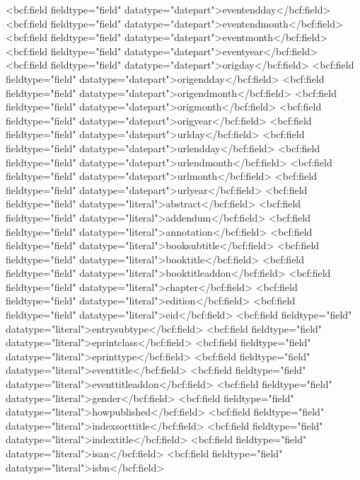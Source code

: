       <bcf:field fieldtype="field" datatype="datepart">eventendday</bcf:field>
      <bcf:field fieldtype="field" datatype="datepart">eventendmonth</bcf:field>
      <bcf:field fieldtype="field" datatype="datepart">eventmonth</bcf:field>
      <bcf:field fieldtype="field" datatype="datepart">eventyear</bcf:field>
      <bcf:field fieldtype="field" datatype="datepart">origday</bcf:field>
      <bcf:field fieldtype="field" datatype="datepart">origendday</bcf:field>
      <bcf:field fieldtype="field" datatype="datepart">origendmonth</bcf:field>
      <bcf:field fieldtype="field" datatype="datepart">origmonth</bcf:field>
      <bcf:field fieldtype="field" datatype="datepart">origyear</bcf:field>
      <bcf:field fieldtype="field" datatype="datepart">urlday</bcf:field>
      <bcf:field fieldtype="field" datatype="datepart">urlendday</bcf:field>
      <bcf:field fieldtype="field" datatype="datepart">urlendmonth</bcf:field>
      <bcf:field fieldtype="field" datatype="datepart">urlmonth</bcf:field>
      <bcf:field fieldtype="field" datatype="datepart">urlyear</bcf:field>
      <bcf:field fieldtype="field" datatype="literal">abstract</bcf:field>
      <bcf:field fieldtype="field" datatype="literal">addendum</bcf:field>
      <bcf:field fieldtype="field" datatype="literal">annotation</bcf:field>
      <bcf:field fieldtype="field" datatype="literal">booksubtitle</bcf:field>
      <bcf:field fieldtype="field" datatype="literal">booktitle</bcf:field>
      <bcf:field fieldtype="field" datatype="literal">booktitleaddon</bcf:field>
      <bcf:field fieldtype="field" datatype="literal">chapter</bcf:field>
      <bcf:field fieldtype="field" datatype="literal">edition</bcf:field>
      <bcf:field fieldtype="field" datatype="literal">eid</bcf:field>
      <bcf:field fieldtype="field" datatype="literal">entrysubtype</bcf:field>
      <bcf:field fieldtype="field" datatype="literal">eprintclass</bcf:field>
      <bcf:field fieldtype="field" datatype="literal">eprinttype</bcf:field>
      <bcf:field fieldtype="field" datatype="literal">eventtitle</bcf:field>
      <bcf:field fieldtype="field" datatype="literal">eventtitleaddon</bcf:field>
      <bcf:field fieldtype="field" datatype="literal">gender</bcf:field>
      <bcf:field fieldtype="field" datatype="literal">howpublished</bcf:field>
      <bcf:field fieldtype="field" datatype="literal">indexsorttitle</bcf:field>
      <bcf:field fieldtype="field" datatype="literal">indextitle</bcf:field>
      <bcf:field fieldtype="field" datatype="literal">isan</bcf:field>
      <bcf:field fieldtype="field" datatype="literal">isbn</bcf:field>
